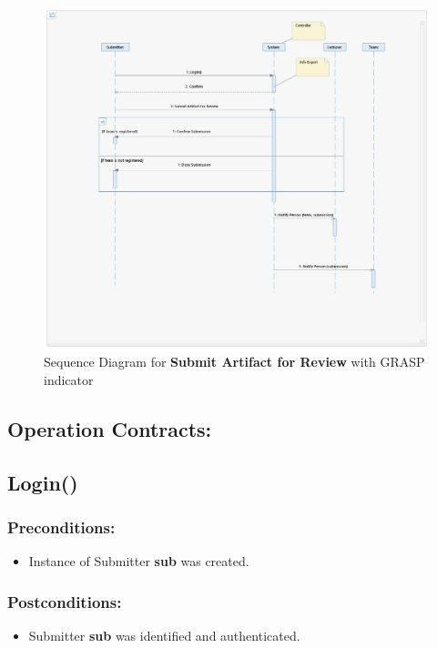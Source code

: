 \begin{figure}[h]
\includegraphics[width=14cm]{SD_SubmitArtifactForReview.jpeg}
\centering
\caption{Sequence Diagram for \textbf{Submit Artifact for Review} with GRASP indicator}
\end{figure}






\subsection*{Operation Contracts:}
\subsection*{Login()}

\subsubsection*{Preconditions:}
\begin{itemize}
\itemsep-1.5em 
    \item Instance of Submitter \textbf{sub} was created.
   
\end{itemize}



\subsubsection*{Postconditions:}
\begin{itemize}
\itemsep-1.5em 
    \item Submitter \textbf{sub} was identified and authenticated.

\end{itemize}



